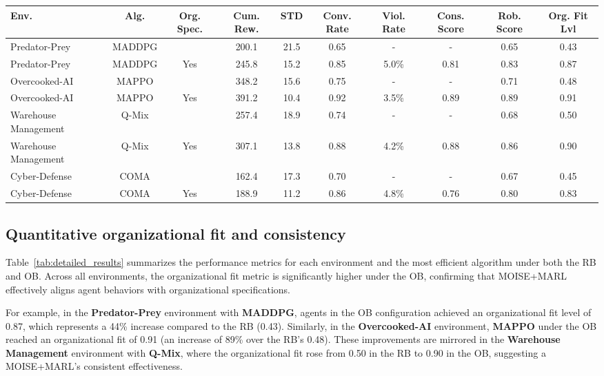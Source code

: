 \documentclass[sigconf,anonymous]{aamas}
\begin{document}
\begin{table*}[h!]
    \centering
    \caption{Detailed results for each environment and favored algorithm under both RB and OB.}
    \label{tab:detailed_results}
    \small
    \renewcommand{\arraystretch}{1.2}
    \begin{tabular}{lccccccccc}
        \hline
        \textbf{Env.} & \textbf{Alg.} & \textbf{Org. Spec.} & \textbf{Cum. Rew.} & \textbf{STD} & \textbf{Conv. Rate} & \textbf{Viol. Rate} & \textbf{Cons. Score} & \textbf{Rob. Score} & \textbf{Org. Fit Lvl} \\ \hline
        Predator-Prey & MADDPG &  & 200.1 & 21.5 & 0.65 & - & - & 0.65 & 0.43 \\
        Predator-Prey & MADDPG & Yes & 245.8 & 15.2 & 0.85 & 5.0\% & 0.81 & 0.83 & 0.87 \\
        Overcooked-AI & MAPPO &  & 348.2 & 15.6 & 0.75 & - & - & 0.71 & 0.48 \\
        Overcooked-AI & MAPPO & Yes & 391.2 & 10.4 & 0.92 & 3.5\% & 0.89 & 0.89 & 0.91 \\
        Warehouse Management & Q-Mix &  & 257.4 & 18.9 & 0.74 & - & - & 0.68 & 0.50 \\
        Warehouse Management & Q-Mix & Yes & 307.1 & 13.8 & 0.88 & 4.2\% & 0.88 & 0.86 & 0.90 \\
        Cyber-Defense & COMA &  & 162.4 & 17.3 & 0.70 & - & - & 0.67 & 0.45 \\
        Cyber-Defense & COMA & Yes & 188.9 & 11.2 & 0.86 & 4.8\% & 0.76 & 0.80 & 0.83 \\ \hline
    \end{tabular}
\end{table*}

\subsection{Quantitative organizational fit and consistency}

Table~\ref{tab:detailed_results} summarizes the performance metrics for each environment and the most efficient algorithm under both the RB and OB. Across all environments, the organizational fit metric is significantly higher under the OB, confirming that MOISE+MARL effectively aligns agent behaviors with organizational specifications.

For example, in the \textbf{Predator-Prey} environment with \textbf{MADDPG}, agents in the OB configuration achieved an organizational fit level of 0.87, which represents a 44\% increase compared to the RB (0.43). Similarly, in the \textbf{Overcooked-AI} environment, \textbf{MAPPO} under the OB reached an organizational fit of 0.91 (an increase of 89\% over the RB's 0.48). These improvements are mirrored in the \textbf{Warehouse Management} environment with \textbf{Q-Mix}, where the organizational fit rose from 0.50 in the RB to 0.90 in the OB, suggesting a MOISE+MARL's consistent effectiveness.
\end{document}
